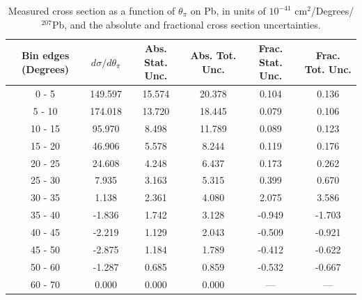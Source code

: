 \documentclass[aps,prl,twocolumn,superscriptaddress,nofootinbib]{revtex4-1}
\begin{document}
\begin{table}[h!]
  \centering
  \caption{Measured cross section as a function of $\theta_{\pi}$ on Pb, in units of
  $10^{-41}$ $\text{cm}^{2}$/Degrees/$^{207}$Pb, and the absolute and
  fractional cross section uncertainties.}
    \begin{tabular}{c||c||c|c||c|c}
      Bin edges (Degrees)  &  $d\sigma/d\theta_{\pi}$  &  Abs. Stat. Unc. & Abs. Tot. Unc.  &  Frac. Stat. Unc.  &  Frac. Tot. Unc. \\
      \hline\hline
        0 - 5 & 149.597 & 15.574 & 20.378 & 0.104 & 0.136 \\
       5 - 10 & 174.018 & 13.720 & 18.445 & 0.079 & 0.106 \\
      10 - 15 & 95.970 & 8.498 & 11.789 & 0.089 & 0.123 \\
      15 - 20 & 46.906 & 5.578 & 8.244 & 0.119 & 0.176 \\
      20 - 25 & 24.608 & 4.248 & 6.437 & 0.173 & 0.262 \\
      25 - 30 & 7.935 & 3.163 & 5.315 & 0.399 & 0.670 \\
      30 - 35 & 1.138 & 2.361 & 4.080 & 2.075 & 3.586 \\
      35 - 40 & -1.836 & 1.742 & 3.128 & -0.949 & -1.703 \\
      40 - 45 & -2.219 & 1.129 & 2.043 & -0.509 & -0.921 \\
      45 - 50 & -2.875 & 1.184 & 1.789 & -0.412 & -0.622 \\
      50 - 60 & -1.287 & 0.685 & 0.859 & -0.532 & -0.667 \\
      60 - 70 & 0.000 & 0.000 & 0.000 & --- & --- \\
    \end{tabular}
  \label{table:ThetaPiXSec_Pb}
\end{table}
\end{document}
